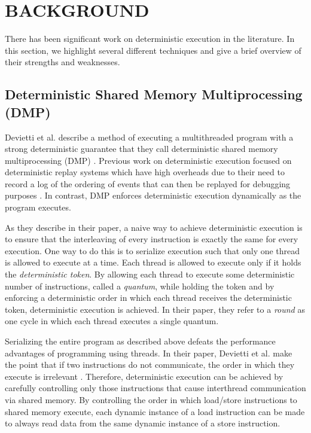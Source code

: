 \chapter{BACKGROUND}
\label{BACKGROUND}

There has been significant work on deterministic execution in the
literature.  In this section, we highlight several different
techniques and give a brief overview of their strengths and
weaknesses.

\section{Deterministic Shared Memory Multiprocessing (DMP)}

Devietti et al. describe a method of executing a multithreaded program
with a strong deterministic guarantee that they call deterministic
shared memory multiprocessing (DMP) \cite{dmp}.  Previous work on
deterministic execution focused on deterministic replay systems which
have high overheads due to their need to record a log of the ordering
of events that can then be replayed for debugging purposes
\cite{recplay}.  In contrast, DMP enforces deterministic execution
dynamically as the program executes.

As they describe in their paper, a naive way to achieve deterministic
execution is to ensure that the interleaving of every instruction is
exactly the same for every execution.  One way to do this is to
serialize execution such that only one thread is allowed to execute at
a time.  Each thread is allowed to execute only if it holds the
\emph{deterministic token}.  By allowing each thread to execute some
deterministic number of instructions, called a \emph{quantum}, while
holding the token and by enforcing a deterministic order in which each
thread receives the deterministic token, deterministic execution is
achieved.  In their paper, they refer to a \emph{round} as one cycle
in which each thread executes a single quantum.

Serializing the entire program as described above defeats the
performance advantages of programming using threads.  In their paper,
Devietti et al. make the point that if two instructions do not
communicate, the order in which they execute is irrelevant \cite{dmp}.
Therefore, deterministic execution can be achieved by carefully
controlling only those instructions that cause interthread
communication via shared memory.  By controlling the order in which
load/store instructions to shared memory execute, each dynamic
instance of a load instruction can be made to always read data from
the same dynamic instance of a store instruction.

